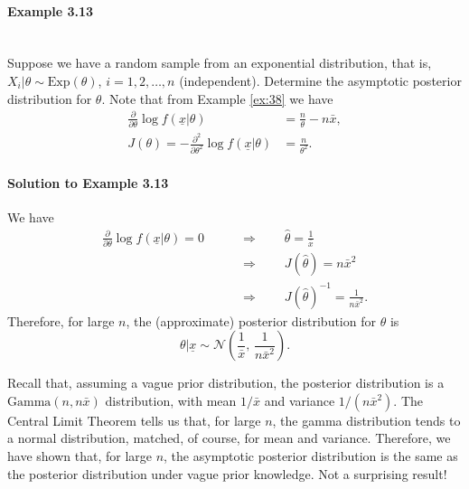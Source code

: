 \paragraph{Example 3.13}{~\\
Suppose we have a random sample from an exponential distribution, that is, $X_i|\theta\sim \text{Exp}(\theta)$, $i=1,2,\ldots,n$ (independent). Determine the asymptotic posterior distribution for $\theta$. Note that from Example \ref{ex:38} we have
\begin{align*}
\frac{\partial}{\partial\theta} \log
f(\underline{x}|\theta)&=\frac{n}{\theta}-n\bar x , \\
J(\theta)=-\frac{\partial^2}{\partial\theta^2} \log
f(\underline{x}|\theta)&=\frac{n}{\theta^2}.
\end{align*}

\paragraph{Solution to Example 3.13}{
    
    We have
    \begin{align*}
    \frac{\partial}{\partial\theta} \log f(\underline{x}|\theta)=0
    \quad\quad&\Longrightarrow\quad\quad
    \hat\theta=\frac{1}{\bar x} \\
    &\Longrightarrow\quad\quad
    J(\hat\theta)=n\bar x^2 \\
    &\Longrightarrow\quad\quad
    J(\hat\theta)^{-1}=\frac{1}{n\bar x^2}.
    \end{align*}
    Therefore, for large $n$, the (approximate) posterior distribution for $\theta$ is
    $$
    \theta|\underline{x}\sim \mathcal{N}\left(\frac{1}{\bar x},\,\frac{1}{n\bar x^2}\right).
    $$
    
    
}

Recall that, assuming a vague prior distribution, the posterior
distribution is a $\text{Gamma}(n,n\bar x)$ distribution, with mean $1/\bar x$
and variance $1/(n\bar x^2)$. The Central Limit Theorem tells us that,
for large $n$, the gamma distribution tends to a normal distribution,
matched, of course, for mean and variance. Therefore, we have shown
that, for large $n$, the asymptotic posterior distribution is the same
as the posterior distribution under vague prior knowledge. Not a
surprising result!}

\newpage

